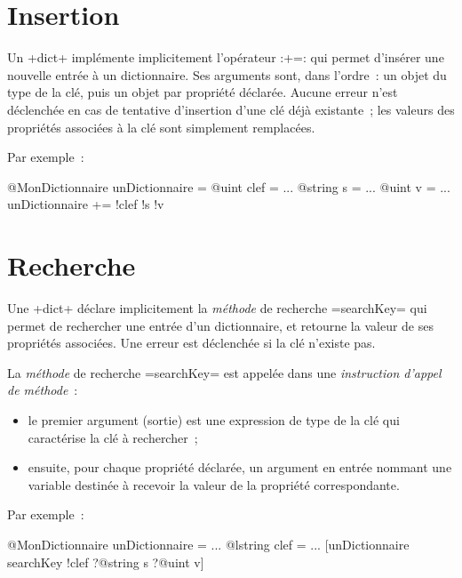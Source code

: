  




\section{Insertion}

Un \ggs+dict+ implémente implicitement l'opérateur \ggs:+=: qui permet d'insérer une nouvelle entrée à un dictionnaire. Ses arguments sont, dans l'ordre~: un objet du type de la clé, puis un objet par propriété déclarée. Aucune erreur n'est déclenchée en cas de tentative d'insertion d'une clé déjà existante~; les valeurs des propriétés associées à la clé sont simplement remplacées.

Par exemple~:
\begin{galgas}
@MonDictionnaire unDictionnaire = {}
@uint clef = ...
@string s = ...
@uint v = ...
unDictionnaire += !clef !s !v
\end{galgas}











\section{Recherche}

Une \ggs+dict+ déclare implicitement la \emph{méthode} de recherche \ggs=searchKey= qui permet de rechercher une entrée d'un dictionnaire, et retourne la valeur de ses propriétés associées. Une erreur est déclenchée si la clé n'existe pas.

La \emph{méthode} de recherche \ggs=searchKey= est appelée dans une \emph{instruction d'appel de méthode}~:
\begin{itemize}
  \item le premier argument (sortie) est une expression de type de la clé qui caractérise la clé à rechercher~;
  \item ensuite, pour chaque propriété déclarée, un argument en entrée nommant une variable destinée à recevoir la valeur de la propriété correspondante.
\end{itemize}


Par exemple~:
\begin{galgas}
@MonDictionnaire unDictionnaire = {}
...
@lstring clef = ...
[unDictionnaire searchKey !clef ?@string s ?@uint v]
\end{galgas}








